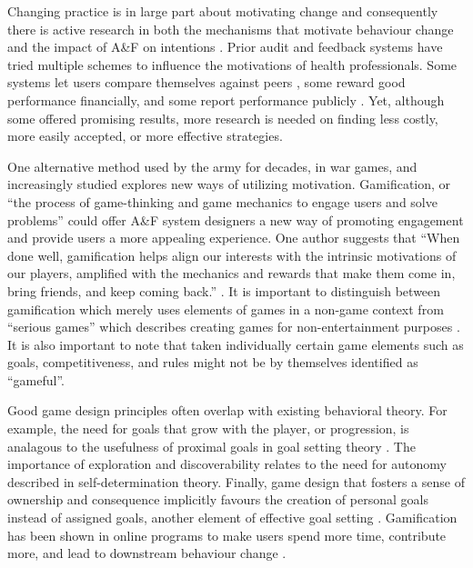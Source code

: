 Changing practice is in large part about motivating change and consequently there is active research in both the mechanisms that motivate behaviour change \cite{michie2011behaviour} and the impact of A\&F on intentions \cite{gude2018health}. Prior audit and feedback systems have tried multiple schemes to influence the motivations of health professionals. Some systems let users compare themselves against peers \cite{ehrenfeld2014automated}, some reward good performance financially\cite{campbell2007payperf}, and some report performance publicly \cite{schneider1998use}. Yet, although some offered promising results, more research is needed on finding less costly, more easily accepted, or more effective strategies.

One alternative method used by the army for decades, in war games, and increasingly studied explores new ways of utilizing motivation.  Gamification, or “the process of game-thinking and game mechanics to engage users and solve problems” \cite{zichermann2011gamification} could offer A\&F system designers a new way of promoting engagement and provide users a more appealing experience. One author suggests that “When done well, gamification helps align our interests with the intrinsic motivations of our players, amplified with the mechanics and rewards that make them come in, bring friends, and keep coming back.” \cite{zichermann2011gamification}. It is important to distinguish between gamification which merely uses elements of games in a non-game context from “serious games” which describes creating games for non-entertainment purposes \cite{deterding2011game}. It is also important to note that taken individually certain game elements such as goals, competitiveness, and rules might not be by themselves identified as “gameful”. 

Good game design principles often overlap with existing behavioral theory. For example, the need for goals that grow with the player, or progression, is analagous to the usefulness of proximal goals in goal setting theory \cite{locke2002building}. The importance of exploration and discoverability relates to the need for autonomy described in self-determination theory. Finally, game design that fosters a sense of ownership and consequence implicitly favours the creation of personal goals instead of assigned goals, another element of effective goal setting \cite{locke1990theory}. Gamification has been shown in online programs to make users spend more time, contribute more, and lead to downstream behaviour change \cite{looyestyn2017does}.

